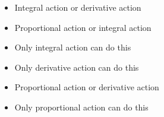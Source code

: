 \begin{itemize}
\item{} Integral action or derivative action
\vskip 5pt 
\item{} Proportional action or integral action
\vskip 5pt 
\item{} Only integral action can do this
\vskip 5pt 
\item{} Only derivative action can do this
\vskip 5pt 
\item{} Proportional action or derivative action
\vskip 5pt 
\item{} Only proportional action can do this
\end{itemize}





